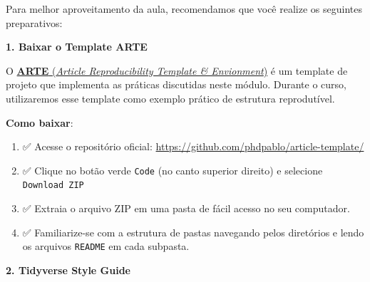 \documentclass[
  a4paper,
]{book}
\providecommand{\tightlist}{%
  \setlength{\itemsep}{0pt}\setlength{\parskip}{0pt}}\usepackage{longtable,booktabs,array}
\newcommand{\emojitext}[1]{{\emoji #1}}
\begin{document}
\begin{tcolorbox}[enhanced jigsaw, colback=white, toptitle=1mm, opacityback=0, left=2mm, rightrule=.15mm, title=\textcolor{quarto-callout-important-color}{\faExclamation}\hspace{0.5em}{Pré-requisitos}, coltitle=black, opacitybacktitle=0.6, breakable, toprule=.15mm, bottomtitle=1mm, titlerule=0mm, bottomrule=.15mm, arc=.35mm, leftrule=.75mm, colframe=quarto-callout-important-color-frame, colbacktitle=quarto-callout-important-color!10!white]

Para melhor aproveitamento da aula, recomendamos que você realize os
seguintes preparativos:

\vspace{10pt}

\textbf{1. Baixar o Template ARTE}

\vspace{10pt}

O \href{https://github.com/phdpablo/article-template/}{\textbf{ARTE}
(\emph{Article Reproducibility Template \& Envionment})} é um template
de projeto que implementa as práticas discutidas neste módulo. Durante o
curso, utilizaremos esse template como exemplo prático de estrutura
reprodutível.

\vspace{10pt}

\textbf{Como baixar}:

\vspace{10pt}

\begin{enumerate}
\def\labelenumi{\arabic{enumi}.}
\tightlist
\item
  \emojitext{✅} Acesse o repositório oficial:
  \url{https://github.com/phdpablo/article-template/}
\item
  \emojitext{✅} Clique no botão verde \texttt{Code} (no canto superior
  direito) e selecione \texttt{Download\ ZIP}
\item
  \emojitext{✅} Extraia o arquivo ZIP em uma pasta de fácil acesso no
  seu computador.
\item
  \emojitext{✅} Familiarize-se com a estrutura de pastas navegando
  pelos diretórios e lendo os arquivos \texttt{README} em cada subpasta.
\end{enumerate}

\vspace{10pt}

\textbf{2. Tidyverse Style Guide}

\vspace{10pt}


\end{tcolorbox}
\end{document}
